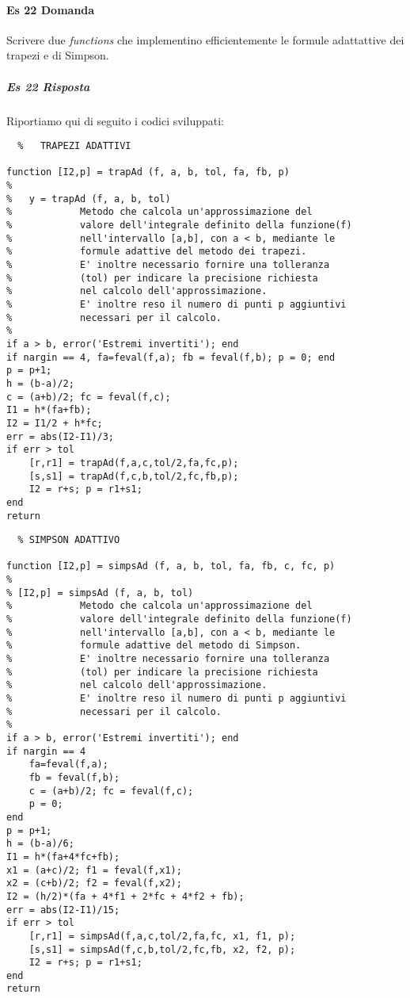 \documentclass[a4paper]{report}
\begin{document}
\paragraph{Es 22 Domanda}
Scrivere due \emph{functions} che implementino efficientemente le formule adattattive dei trapezi e di Simpson.
\subparagraph{Es 22 Risposta}
Riportiamo qui di seguito i codici sviluppati:\\
\begin{lstlisting}	%	TRAPEZI ADATTIVI

function [I2,p] = trapAd (f, a, b, tol, fa, fb, p)
%
%   y = trapAd (f, a, b, tol)
%            Metodo che calcola un'approssimazione del 
%            valore dell'integrale definito della funzione(f) 
%            nell'intervallo [a,b], con a < b, mediante le  
%            formule adattive del metodo dei trapezi. 
%            E' inoltre necessario fornire una tolleranza
%            (tol) per indicare la precisione richiesta
%            nel calcolo dell'approssimazione.
%            E' inoltre reso il numero di punti p aggiuntivi
%            necessari per il calcolo.
%
if a > b, error('Estremi invertiti'); end
if nargin == 4, fa=feval(f,a); fb = feval(f,b); p = 0; end
p = p+1;
h = (b-a)/2;
c = (a+b)/2; fc = feval(f,c);
I1 = h*(fa+fb);
I2 = I1/2 + h*fc;
err = abs(I2-I1)/3;
if err > tol
	[r,r1] = trapAd(f,a,c,tol/2,fa,fc,p);
	[s,s1] = trapAd(f,c,b,tol/2,fc,fb,p);
	I2 = r+s; p = r1+s1;
end
return
\end{lstlisting}
\newpage
\begin{lstlisting}	% SIMPSON ADATTIVO

function [I2,p] = simpsAd (f, a, b, tol, fa, fb, c, fc, p)
%
% [I2,p] = simpsAd (f, a, b, tol)
%            Metodo che calcola un'approssimazione del 
%            valore dell'integrale definito della funzione(f) 
%            nell'intervallo [a,b], con a < b, mediante le  
%            formule adattive del metodo di Simpson.
%            E' inoltre necessario fornire una tolleranza
%            (tol) per indicare la precisione richiesta
%            nel calcolo dell'approssimazione.
%            E' inoltre reso il numero di punti p aggiuntivi
%            necessari per il calcolo.
%                        
if a > b, error('Estremi invertiti'); end
if nargin == 4
	fa=feval(f,a);
	fb = feval(f,b);
	c = (a+b)/2; fc = feval(f,c);
	p = 0;
end
p = p+1;
h = (b-a)/6;
I1 = h*(fa+4*fc+fb);
x1 = (a+c)/2; f1 = feval(f,x1);
x2 = (c+b)/2; f2 = feval(f,x2);
I2 = (h/2)*(fa + 4*f1 + 2*fc + 4*f2 + fb);
err = abs(I2-I1)/15;
if err > tol
	[r,r1] = simpsAd(f,a,c,tol/2,fa,fc, x1, f1, p);
	[s,s1] = simpsAd(f,c,b,tol/2,fc,fb, x2, f2, p);
	I2 = r+s; p = r1+s1;
end
return
\end{lstlisting}
\newpage
\end{document}
